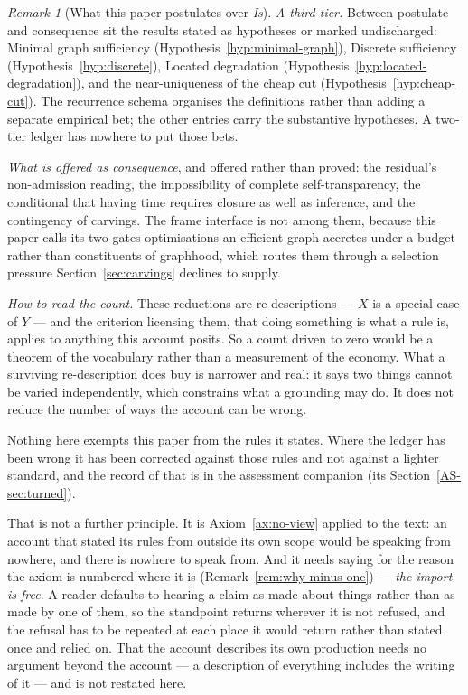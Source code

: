 \documentclass[11pt,a4paper]{article}
\theoremstyle{remark}\newtheorem{remark}[definition]{Remark}
\begin{document}
\begin{remark}[What this paper postulates over \emph{Is}]
\emph{A third tier.} Between postulate and consequence sit the results stated as hypotheses or marked
undischarged: Minimal graph sufficiency (Hypothesis~\ref{hyp:minimal-graph}), Discrete sufficiency
(Hypothesis~\ref{hyp:discrete}), Located degradation (Hypothesis~\ref{hyp:located-degradation}), and the near-uniqueness of the
cheap cut (Hypothesis~\ref{hyp:cheap-cut}). The recurrence schema organises the definitions rather than adding a separate empirical bet; the other entries carry the substantive hypotheses. A two-tier ledger has nowhere to put those bets.

\emph{What is offered as consequence}, and offered rather than proved: the residual's non-admission
reading, the impossibility of complete self-transparency, the conditional that having time requires
closure as well as inference, and the contingency of carvings. The frame interface is not among them,
because this paper calls its two gates optimisations an efficient graph accretes under a budget rather
than constituents of graphhood, which routes them through a selection pressure
Section~\ref{sec:carvings} declines to supply.

\emph{How to read the count.} These reductions are re-descriptions --- $X$ is a special case of $Y$ ---
and the criterion licensing them, that doing something is what a rule is, applies to anything this
account posits. So a count driven to zero would be a theorem of the vocabulary rather than a
measurement of the economy. What a
surviving re-description does buy is narrower and real: it says two things cannot be varied
independently, which constrains what a grounding may do. It does not reduce the number of ways the
account can be wrong.

Nothing here exempts this paper from the rules it states. Where the ledger has been wrong it has been
corrected against those rules and not against a lighter standard, and the record of that is in the
assessment companion (its Section~\ref{AS-sec:turned}).

That is not a further principle. It is Axiom~\ref{ax:no-view} applied to the text: an account that stated its rules
from outside its own scope would be speaking from nowhere, and there is nowhere to speak from. And it
needs saying for the reason the axiom is numbered where it is (Remark~\ref{rem:why-minus-one}) ---
\emph{the import is free}. A reader defaults to hearing a claim as made about things rather than as
made by one of them, so the standpoint returns wherever it is not refused, and the refusal has to be
repeated at each place it would return rather than stated once and relied on. That the account
describes its own production needs no argument beyond the account --- a description of everything
includes the writing of it --- and is not restated here.
\end{remark}
\end{document}

